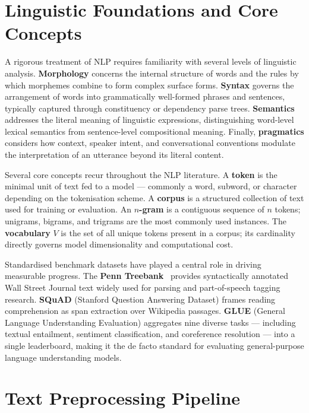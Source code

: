 \documentclass[12pt, a4paper]{article}
\begin{document}
\section{Linguistic Foundations and Core Concepts}

A rigorous treatment of NLP requires familiarity with several levels of
linguistic analysis. \textbf{Morphology} concerns the internal structure of
words and the rules by which morphemes combine to form complex surface forms.
\textbf{Syntax} governs the arrangement of words into grammatically well-formed
phrases and sentences, typically captured through constituency or dependency
parse trees. \textbf{Semantics} addresses the literal meaning of linguistic
expressions, distinguishing word-level lexical semantics from sentence-level
compositional meaning. Finally, \textbf{pragmatics} considers how context,
speaker intent, and conversational conventions modulate the interpretation of an
utterance beyond its literal content.

Several core concepts recur throughout the NLP literature. A \textbf{token} is
the minimal unit of text fed to a model --- commonly a word, subword, or
character depending on the tokenisation scheme. A \textbf{corpus} is a
structured collection of text used for training or evaluation. An
\textbf{$n$-gram} is a contiguous sequence of $n$ tokens; unigrams, bigrams,
and trigrams are the most commonly used instances. The \textbf{vocabulary} $V$
is the set of all unique tokens present in a corpus; its cardinality directly
governs model dimensionality and computational cost.

Standardised benchmark datasets have played a central role in driving measurable
progress. The \textbf{Penn Treebank}~\cite{manning1999statistical} provides
syntactically annotated Wall Street Journal text widely used for parsing and
part-of-speech tagging research. \textbf{SQuAD} (Stanford Question Answering
Dataset) frames reading comprehension as span extraction over Wikipedia passages.
\textbf{GLUE} (General Language Understanding Evaluation) aggregates nine
diverse tasks --- including textual entailment, sentiment classification, and
coreference resolution --- into a single leaderboard, making it the de facto
standard for evaluating general-purpose language understanding models.


\section{Text Preprocessing Pipeline}
\end{document}
